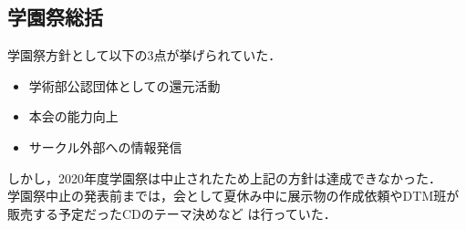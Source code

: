 \subsection*{学園祭総括}

学園祭方針として以下の3点が挙げられていた．
\begin{itemize}
    \item 学術部公認団体としての還元活動
    \item 本会の能力向上
    \item サークル外部への情報発信
\end{itemize}
しかし，2020年度学園祭は中止されたため上記の方針は達成できなかった．\\
学園祭中止の発表前までは，会として夏休み中に展示物の作成依頼やDTM班が販売する予定だったCDのテーマ決めなど
は行っていた．